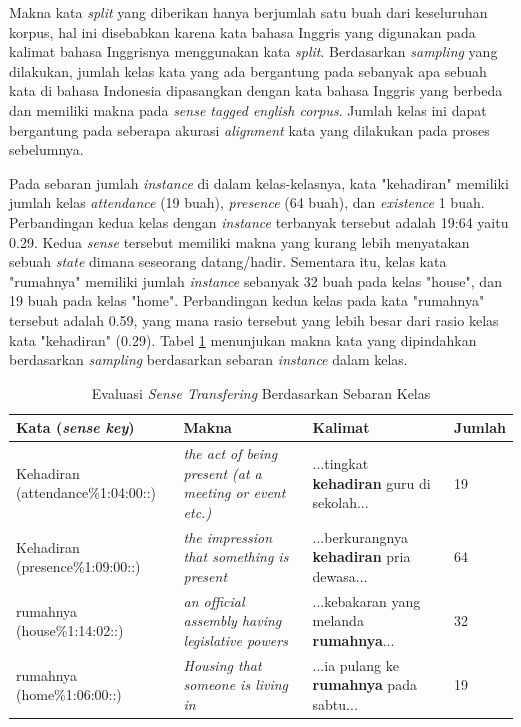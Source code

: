 Makna kata \textit{split} yang diberikan hanya berjumlah satu buah dari keseluruhan korpus, hal ini disebabkan karena kata bahasa Inggris yang digunakan pada kalimat bahasa Inggrisnya menggunakan kata \textit{split}. Berdasarkan \textit{sampling} yang dilakukan, jumlah kelas kata yang ada bergantung pada sebanyak apa sebuah kata di bahasa Indonesia dipasangkan dengan kata bahasa Inggris yang berbeda dan memiliki makna pada \textit{sense tagged english corpus}. Jumlah kelas ini dapat bergantung pada seberapa akurasi \textit{alignment} kata yang dilakukan pada proses sebelumnya.

Pada sebaran jumlah \textit{instance} di dalam kelas-kelasnya, kata "kehadiran" memiliki jumlah kelas \textit{attendance} (19 buah), \textit{presence} (64 buah), dan \textit{existence
} 1 buah. Perbandingan kedua kelas dengan \textit{instance} terbanyak tersebut adalah 19:64 yaitu 0.29. Kedua \textit{sense} tersebut memiliki makna yang kurang lebih menyatakan sebuah \textit{state} dimana seseorang datang/hadir. Sementara itu, kelas kata "rumahnya" memiliki jumlah \textit{instance} sebanyak 32 buah pada kelas "house", dan 19 buah pada kelas "home". Perbandingan kedua kelas pada kata "rumahnya" tersebut adalah 0.59, yang mana rasio tersebut yang lebih besar dari rasio kelas kata "kehadiran" (0.29). Tabel \ref{table:class-instance-sense-transfering-evaluation} menunjukan makna kata yang dipindahkan berdasarkan \textit{sampling} berdasarkan sebaran \textit{instance} dalam kelas.

\begin{table}
	\centering
	\caption{Evaluasi \textit{Sense Transfering} Berdasarkan Sebaran Kelas}
	\label{table:class-instance-sense-transfering-evaluation}
	\begin{tabular}{|p{4cm}|p{2.85cm}|p{2.85cm}|p{1.2cm}|}
		\hline
		\textbf{Kata (\textit{sense key})} & \textbf{Makna} & \textbf{Kalimat} & \textbf{Jumlah}
		\\ \hline
		Kehadiran (attendance\%1:04:00::)  & 
		\textit{the act of being present (at a meeting or event etc.)}   & 
		...tingkat \textbf{kehadiran} guru di sekolah... &
		19
		\\ \hline
		Kehadiran (presence\%1:09:00::) & 
		\textit{the impression that something is present}   & 
		...berkurangnya \textbf{kehadiran} pria dewasa...
		&
		64
		\\ \hline
		rumahnya (house\%1:14:02::) & 
		\textit{an official assembly having legislative powers} & 
		...kebakaran yang melanda \textbf{rumahnya}...
		& 32
		\\ \hline
		rumahnya (home\%1:06:00::) &
		\textit{Housing that someone is living in} &
		...ia pulang ke \textbf{rumahnya} pada sabtu...
		& 19
		\\ \hline
	\end{tabular}
\end{table}

